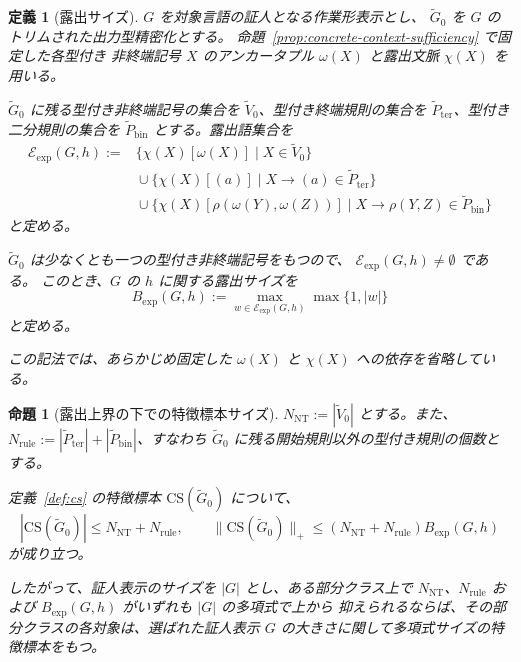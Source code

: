 \documentclass[11pt,a4paper]{ltjsarticle}
\newtheorem{proposition}[theorem]{命題}
\newtheorem{definition}[theorem]{定義}
\theoremstyle{remark}
\newcommand{\CS}{\mathrm{CS}}
\begin{document}
\begin{definition}[露出サイズ]
\label{def:exposure-size}
\(G\) を対象言語の証人となる作業形表示とし、
\(\widetilde G_0\) を \(G\) のトリムされた出力型精密化とする。
命題~\ref{prop:concrete-context-sufficiency} で固定した各型付き
非終端記号 \(X\) のアンカータプル \(\omega(X)\) と露出文脈
\(\chi(X)\) を用いる。

\(\widetilde G_0\) に残る型付き非終端記号の集合を
\(\widetilde V_0\)、型付き終端規則の集合を
\(\widetilde P_{\mathrm{ter}}\)、型付き二分規則の集合を
\(\widetilde P_{\mathrm{bin}}\) とする。露出語集合を
\[
\begin{aligned}
\mathcal E_{\mathrm{exp}}(G,h)
:={}&
 \{\chi(X)[\omega(X)]\mid X\in\widetilde V_0\}\\
&{}\cup
 \{\chi(X)[(a)]\mid X\to(a)\in\widetilde P_{\mathrm{ter}}\}\\
&{}\cup
 \{\chi(X)[\rho(\omega(Y),\omega(Z))]
      \mid X\to\rho(Y,Z)\in\widetilde P_{\mathrm{bin}}\}
\end{aligned}
\]
と定める。

\(\widetilde G_0\) は少なくとも一つの型付き非終端記号をもつので、
\(\mathcal E_{\mathrm{exp}}(G,h)\ne\emptyset\) である。
このとき、\(G\) の \(h\) に関する\emph{露出サイズ}を
\[
  B_{\mathrm{exp}}(G,h)
  :=
  \max_{w\in\mathcal E_{\mathrm{exp}}(G,h)}
  \max\{1,|w|\}
\]
と定める。

この記法では、あらかじめ固定した
\(\omega(X)\) と \(\chi(X)\) への依存を省略している。
\end{definition}

\begin{proposition}[露出上界の下での特徴標本サイズ]
\label{prop:cs-exposure-bound}
\(N_{\mathrm{NT}}:=|\widetilde V_0|\) とする。また、
\(N_{\mathrm{rule}}
:=|\widetilde P_{\mathrm{ter}}|
 +|\widetilde P_{\mathrm{bin}}|\)、すなわち
\(\widetilde G_0\) に残る開始規則以外の型付き規則の個数とする。

定義~\ref{def:cs} の特徴標本
\(\CS(\widetilde G_0)\) について、
\[
  |\CS(\widetilde G_0)|
  \le N_{\mathrm{NT}}+N_{\mathrm{rule}},
  \qquad
  \|\CS(\widetilde G_0)\|_+
  \le
  (N_{\mathrm{NT}}+N_{\mathrm{rule}})
  B_{\mathrm{exp}}(G,h)
\]
が成り立つ。

したがって、証人表示のサイズを \(|G|\) とし、ある部分クラス上で
\(N_{\mathrm{NT}}\)、\(N_{\mathrm{rule}}\) および
\(B_{\mathrm{exp}}(G,h)\) がいずれも \(|G|\) の多項式で上から
抑えられるならば、その部分クラスの各対象は、選ばれた証人表示
\(G\) の大きさに関して多項式サイズの特徴標本をもつ。
\end{proposition}
\end{document}

